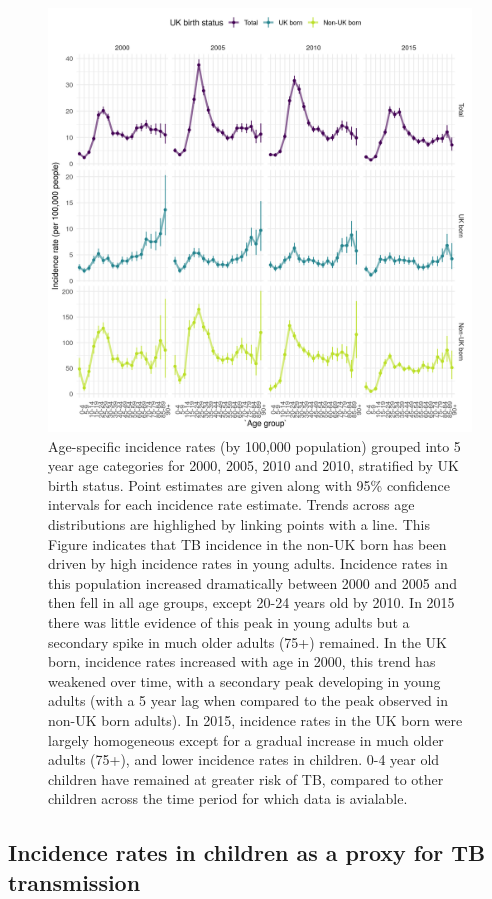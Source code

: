 \documentclass[11pt,twoside]{bristolthesis}
\begin{document}
  \begin{figure}
  
  {\centering \includegraphics[width=0.8\linewidth,]{chapters/tb-epi-england/figures/plot-age-dist-inc-rates} 
  
  }
  
  \caption[Age-specific incidence rates (by 100,000 population) grouped into 5 year age categories for 2000, 2005, 2010 and 2010, stratified by UK birth status.]{Age-specific incidence rates (by 100,000 population) grouped into 5 year age categories for 2000, 2005, 2010 and 2010, stratified by UK birth status. Point estimates are given along with 95\% confidence intervals for each incidence rate estimate. Trends across age distributions are highlighed by linking points with a line. This Figure indicates that TB incidence in the non-UK born has been driven by high incidence rates in young adults. Incidence rates in this population increased dramatically between 2000 and 2005 and then fell in all age groups, except 20-24 years old by 2010. In 2015 there was little evidence of this peak in young adults but a secondary spike in much older adults (75+) remained. In the UK born, incidence rates increased with age in 2000, this trend has weakened over time, with a secondary peak developing in young adults (with a 5 year lag when compared to the peak observed in non-UK born adults). In 2015, incidence rates in the UK born were largely homogeneous except for a gradual increase in much older adults (75+), and lower incidence rates in children. 0-4 year old children have remained at greater risk of TB, compared to other children across the time period for which data is avialable.}\label{fig:plot-age-dist-inc-rates}
  \end{figure}
  \hypertarget{incidence-rates-in-children-as-a-proxy-for-tb-transmission}{%
  \subsection{Incidence rates in children as a proxy for TB transmission}\label{incidence-rates-in-children-as-a-proxy-for-tb-transmission}}
  
\end{document}
